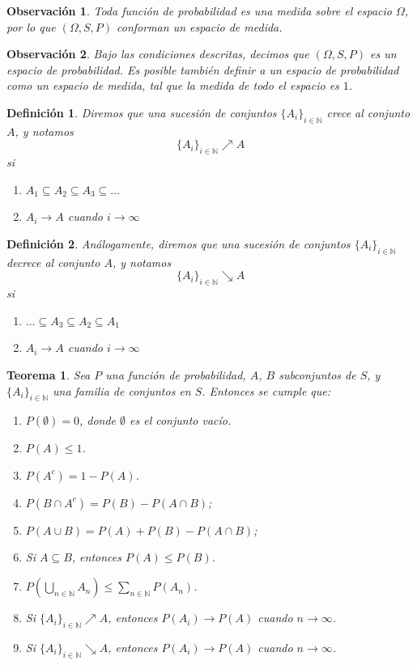 \documentclass{report}
\newtheorem{thm}{Teorema}[subsection]
\newtheorem{dfn}{Definición}[subsection]
\newtheorem{obs}{Observación}[subsection]
\begin{document}
\begin{obs}
    Toda función de probabilidad es una medida sobre el espacio $\Omega$, por lo que $(\Omega, S, P)$ conforman un espacio de medida.
\end{obs}

\begin{obs}
    Bajo las condiciones descritas, decimos que $(\Omega, S, P)$ es un \emph{espacio de probabilidad}. Es posible también definir
    a un espacio de probabilidad como un espacio de medida, tal que la medida de todo el espacio es $1$.
\end{obs}

\begin{dfn}
Diremos que una sucesión de conjuntos $\{A_i\}_{i\in\mathbb{N}}$ \emph{crece} al conjunto $A$, y notamos
$$
\{A_i\}_{i\in\mathbb{N}}\nearrow A
$$
si
\begin{enumerate}
    \item $A_1 \subseteq A_2 \subseteq A_3 \subseteq \dots$
    \item $A_i \rightarrow A$ cuando $i\rightarrow \infty$
\end{enumerate}
\end{dfn}

\begin{dfn}
Análogamente, diremos que una sucesión de conjuntos $\{A_i\}_{i\in\mathbb{N}}$ \emph{decrece} al conjunto $A$, y notamos
$$
\{A_i\}_{i\in\mathbb{N}}\searrow A
$$
si
\begin{enumerate}
    \item $\ldots \subseteq A_3 \subseteq A_2 \subseteq A_1 $
    \item $A_i \rightarrow A$ cuando $i\rightarrow \infty$
\end{enumerate}
\end{dfn}

\begin{thm}
Sea \( P \) una función de probabilidad, $A$, $B$ subconjuntos de \(S\), y $\{A_i\}_{i\in\mathbb{N}}$ una familia de conjuntos en $S$. 
Entonces se cumple que:

\begin{enumerate}
    \item \( P(\emptyset) = 0 \), donde \( \emptyset \) es el conjunto vacío.
    \item \( P(A) \leq 1 \).
    \item \( P(A^c) = 1 - P(A) \).
    \item \( P(B \cap A^c) = P(B) - P(A \cap B) \);
    \item \( P(A \cup B) = P(A) + P(B) - P(A \cap B) \);
    \item Si \( A \subseteq B \), entonces \( P(A) \leq P(B) \).
    \item $P\left(\bigcup_{n\in\mathbb{N}}A_n\right) \leq \sum_{n\in\mathbb{N}}P(A_n)$.
    \item Si $\{A_i\}_{i\in\mathbb{N}}\nearrow A$, entonces $P(A_i)\rightarrow P(A)$ cuando $n\rightarrow \infty$.
    \item Si $\{A_i\}_{i\in\mathbb{N}}\searrow A$, entonces $P(A_i)\rightarrow P(A)$ cuando $n\rightarrow \infty$.
\end{enumerate}
\end{thm}
\end{document}
